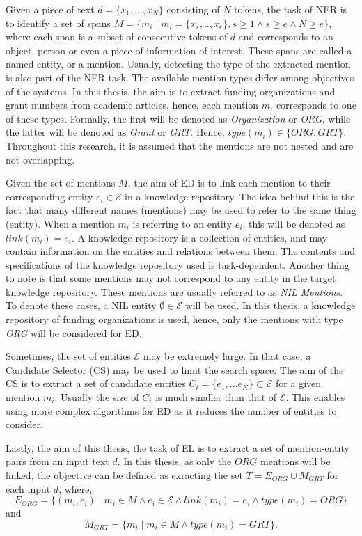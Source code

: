 \documentclass{article}
\theoremstyle{definition}
\theoremstyle{remark}
\begin{document}
Given a piece of text $d=\{x_1,...,x_N\}$ consisting of $N$ tokens, the task of NER is to identify a set of spans $M = \{m_i \mid m_i = \{x_s,..,x_e\}, s \geq 1 \land s\geq e \land N \geq e\}$, where each span is a subset of consecutive tokens of $d$ and corresponds to an object, person or even a piece of information of interest. These spans are called a named entity, or a mention. Usually, detecting the type of the extracted mention is also part of the NER task. The available mention types differ among objectives of the systems. In this thesis, the aim is to extract funding organizations and grant numbers from academic articles, hence, each mention $m_i$ corresponds to one of these types. Formally, the first will be denoted as \textit{Organization} or \textit{ORG}, while the latter will be denoted as \textit{Grant} or \textit{GRT}. Hence, $type(m_i) \in \{ORG,GRT\}$. Throughout this research, it is assumed that the mentions are not nested and are not overlapping.

Given the set of mentions $M$, the aim of ED is to link each mention to their corresponding entity $e_i \in \mathcal{E} $ in a knowledge repository. The idea behind this is the fact that many different names (mentions) may be used to refer to the same thing (entity). When a mention $m_i$ is referring to an entity $e_i$, this will be denoted as $link(m_i) = e_i $. A knowledge repository is a collection of entities, and may contain information on the entities and relations between them. The contents and specifications of the knowledge repository used is task-dependent. Another thing to note is that some mentions may not correspond to any entity in the target knowledge repository. These mentions are usually referred to as \textit{NIL Mentions}. To denote these cases, a NIL entity $\emptyset \in \mathcal{E}$ will be used. In this thesis, a knowledge repository of funding organizations is used, hence, only the mentions with type \textit{ORG} will be considered for ED.

Sometimes, the set of entities $\mathcal{E}$ may be extremely large. In that case, a Candidate Selector (CS) may be used to limit the search space. The aim of the CS is to extract a set of candidate entities $C_i = \{e_1,...e_K\} \subset \mathcal{E} $ for a given mention $m_i$. Usually the size of $C_i$ is much smaller than that of $\mathcal{E}$. This enables using more complex algorithms for ED as it reduces the number of entities to consider.

Lastly, the aim of this thesis, the task of EL is to extract a set of mention-entity pairs from an input text $d$. In this thesis, as only the $ORG$ mentions will be linked, the objective can be defined as exracting the set $T = E_{ORG} \cup M_{GRT}$ for each input $d$, where,
\begin{equation}
E_{ORG}=\{(m_i,e_i) \mid m_i \in M \land e_i \in \mathcal{E} \land link(m_i)=e_i \land type(m_i) = ORG\}
\end{equation}
and 
\begin{equation}
M_{GRT} = \{m_i \mid m_i \in M \land type(m_i) = GRT\}.
\end{equation}
\end{document}
